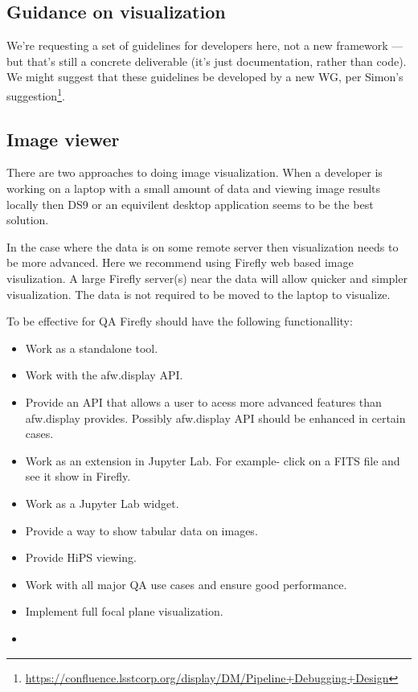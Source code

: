 \documentclass[DM,authoryear,toc,lsstdraft]{lsstdoc}
\begin{document}

\subsection{Guidance on visualization}


We're requesting a set of guidelines for developers here, not a new framework
--- but that's still a concrete deliverable (it's just documentation, rather
than code). We might suggest that these guidelines be developed by a new WG,
per Simon's
suggestion\footnote{\url{https://confluence.lsstcorp.org/display/DM/Pipeline+Debugging+Design}}.

\subsection{Image viewer}


There are two approaches to doing image visualization.  When a developer is working on a laptop with a
small amount of data and viewing image results locally then DS9 or an equivilent desktop application seems
to be the best solution.

In the case where the data is on some remote server then visualization needs to
be more advanced. Here we recommend using Firefly web based image visulization. A large Firefly server(s) near the
data will allow quicker and simpler visualization. The data is not required to be moved to the laptop to visualize.

To be effective for QA Firefly should have the following functionallity:
\begin{itemize}
  \item{Work as a standalone tool. }
  \item{Work with the afw.display API.}
  \item{Provide an API that allows a user to acess more advanced features than afw.display provides.
  Possibly afw.display API should be enhanced in certain cases.}
  \item{Work as an extension in Jupyter Lab. For example- click on a FITS file and see it show in Firefly.}
  \item{Work as a Jupyter Lab widget.}
  \item{Provide a way to show tabular data on images.}
  \item{Provide HiPS viewing.}
  \item{Work with all major QA use cases and ensure good performance.}
  \item{Implement full focal plane visualization.}
  \item
\end{itemize}
\end{document}
